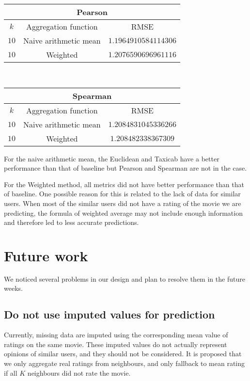 \documentclass[final]{cvpr}
\begin{document}
\hspace{2em}

\begin{tabular}{| c | c | c |}
    \hline
    \multicolumn{3}{|c|}{\textbf{Pearson}}\\
    \hline
    $k$ & Aggregation function & RMSE\\
    \hline
    $10$ & Naive arithmetic mean & $1.1964910584114306$\\
    \hline
    $10$ & Weighted & $1.2076590696961116$\\
    \hline
\end{tabular}\\

\hspace{2em}

\begin{tabular}{| c | c | c |}
    \hline
    \multicolumn{3}{|c|}{\textbf{Spearman}}\\
    \hline
    $k$ & Aggregation function & RMSE\\
    \hline
    $10$ & Naive arithmetic mean & $1.2084831045336266$\\
    \hline
    $10$ & Weighted & $1.208482338367309$\\
    \hline
\end{tabular}

\hspace{10em}

For the naive arithmetic mean, the Euclidean and Taxicab have a better performance than that of baseline but Pearson and Spearman are not in the case.

For the Weighted method, all metrics did not have better performance than that of baseline. One possible reason for this is related to the lack of data for similar users. When most of the similar users did not have a rating of the movie we are predicting, the formula of weighted average may not include enough information and therefore led to less accurate predictions.

\section{Future work}
We noticed several problems in our design and plan to resolve them in the future weeks.

\subsection{Do not use imputed values for prediction}
Currently, missing data are imputed using the corresponding mean value of ratings on the same movie.
These imputed values do not actually represent opinions of similar users,
and they should not be considered.
It is proposed that we only aggregate real ratings from neighbours,
and only fallback to mean rating if all $K$ neighbours did not rate the movie.
\end{document}
